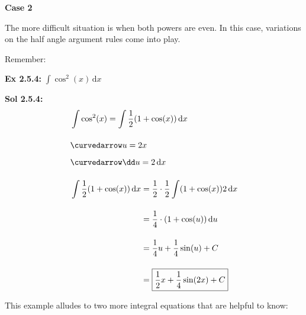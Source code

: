 \textbf{Case 2} \par

The more difficult situation is when both powers are even. In this case, variations on the half angle argument rules come into play. \par

Remember: \par


\begin{tcolorbox}[example]
    \textbf{Ex 2.5.4: } $\int \cos^2 (x) \,\mathrm{d}x$
\end{tcolorbox}
\begin{tcolorbox}[solution]
    \textbf{Sol 2.5.4: } \begin{align*}
        & \int \cos^2 (x) = \int \dfrac{1}{2}(1 + \cos (x)) \,\mathrm{d}x \\[11pt]
        & \curvedarrow u = 2x \\[5.5pt]
        & \curvedarrow \dd u = 2 \,\mathrm{d}x \\[11pt]
        & \int \dfrac{1}{2}(1 + \cos (x)) \,\mathrm{d}x \begin{aligned}[t]
            & = \dfrac{1}{2} \cdot \dfrac{1}{2}\int (1 + \cos (x)) 2 \,\mathrm{d}x \\[11pt]
            & = \dfrac{1}{4} \cdot (1 + \cos (u)) \,\mathrm{d}u \\[11pt]
            & = \dfrac{1}{4}u + \dfrac{1}{4}\sin (u) + C \\[11pt]
            & = \boxed{\dfrac{1}{2}x + \dfrac{1}{4}\sin (2x) + C}
        \end{aligned}
    \end{align*}
\end{tcolorbox}

This example alludes to two more integral equations that are helpful to know: \par


